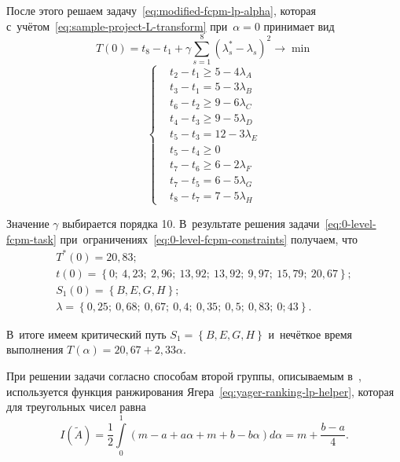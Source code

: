 После этого решаем задачу~\eqref{eq:modified-fcpm-lp-alpha}, которая с~учётом~\eqref{eq:sample-project-L-transform} при~$\alpha=0$ принимает вид
\begin{equation}
\label{eq:0-level-fcpm-task}
  T\left( 0 \right)=t_8-t_1+\gamma \sum\limits_{s=1}^{8}\left( \lambda_{s}^{*}-\lambda_s \right)^{2}\to \min
\end{equation}
\begin{equation}
\label{eq:0-level-fcpm-constraints}
  \left\{ \begin{aligned}
    & t_2-t_1 \geqslant 5-4\lambda_A \\ 
    & t_3-t_1=5-3\lambda_B \\ 
    & t_6-t_2 \geqslant 9-6\lambda_C \\ 
    & t_4-t_3 \geqslant 9-5\lambda_D \\ 
    & t_5-t_3=12-3\lambda_E \\ 
    & t_5-t_4 \geqslant 0 \\ 
    & t_7-t_6 \geqslant 6-2\lambda_F \\ 
    & t_7-t_5=6-5\lambda_G \\ 
    & t_8-t_7=7-5\lambda_H
  \end{aligned} \right.
\end{equation}

Значение $\gamma$ выбирается порядка 10. В~результате решения задачи~\eqref{eq:0-level-fcpm-task} при~ограничениях~\eqref{eq:0-level-fcpm-constraints} получаем, что
\begin{gather*}
  T^*\left( 0 \right)=20,83; \\
  t\left(0\right)=\left\{ 0;\ 4,23;\ 2,96;\ 13,92;\ 13,92;\ 9,97;\ 15,79;\ 20,67 \right\}; \\ 
  S_1\left( 0 \right)=\left\{ B,E,G,H \right\}; \\ 
  \lambda =\left\{ 0,25;\ 0,68;\ 0,67;\ 0,4;\ 0,35;\ 0,5;\ 0,83;\ 0;43 \right\}.
\end{gather*}

В~итоге имеем критический путь $S_1=\left\{ B,E,G,H \right\}$ и~нечёткое время выполнения $T\left( \alpha \right)=20,67+2,33\alpha$.

При решении задачи согласно способам второй группы, описываемым в~\cite{Chinese_CPM, FCPA_Ravi_Shankar, Indians_FCPM}, используется функция ранжирования Ягера~\eqref{eq:yager-ranking-lp-helper}, которая для треугольных чисел равна
\begin{equation}
  I\left( \tilde A \right) = \frac{1}{2} \int \limits_{0}^{1} \left(m-a+a\alpha+m+b-b\alpha \right) d\alpha = m+\frac{b-a}{4}.
\end{equation}

